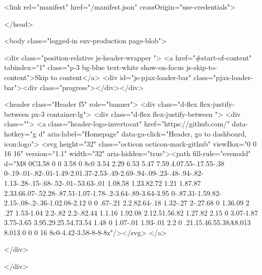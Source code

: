   <link rel="manifest" href="/manifest.json" crossOrigin="use-credentials">

  </head>

  <body class="logged-in env-production page-blob">
    

  <div class="position-relative js-header-wrapper ">
    <a href="#start-of-content" tabindex="1" class="p-3 bg-blue text-white show-on-focus js-skip-to-content">Skip to content</a>
    <div id="js-pjax-loader-bar" class="pjax-loader-bar"><div class="progress"></div></div>

    
    
    



        
<header class="Header  f5" role="banner">
  <div class="d-flex flex-justify-between px-3 container-lg">
    <div class="d-flex flex-justify-between ">
      <div class="">
        <a class="header-logo-invertocat" href="https://github.com/" data-hotkey="g d" aria-label="Homepage" data-ga-click="Header, go to dashboard, icon:logo">
  <svg height="32" class="octicon octicon-mark-github" viewBox="0 0 16 16" version="1.1" width="32" aria-hidden="true"><path fill-rule="evenodd" d="M8 0C3.58 0 0 3.58 0 8c0 3.54 2.29 6.53 5.47 7.59.4.07.55-.17.55-.38 0-.19-.01-.82-.01-1.49-2.01.37-2.53-.49-2.69-.94-.09-.23-.48-.94-.82-1.13-.28-.15-.68-.52-.01-.53.63-.01 1.08.58 1.23.82.72 1.21 1.87.87 2.33.66.07-.52.28-.87.51-1.07-1.78-.2-3.64-.89-3.64-3.95 0-.87.31-1.59.82-2.15-.08-.2-.36-1.02.08-2.12 0 0 .67-.21 2.2.82.64-.18 1.32-.27 2-.27.68 0 1.36.09 2 .27 1.53-1.04 2.2-.82 2.2-.82.44 1.1.16 1.92.08 2.12.51.56.82 1.27.82 2.15 0 3.07-1.87 3.75-3.65 3.95.29.25.54.73.54 1.48 0 1.07-.01 1.93-.01 2.2 0 .21.15.46.55.38A8.013 8.013 0 0 0 16 8c0-4.42-3.58-8-8-8z"/></svg>
</a>

      </div>

    </div>

